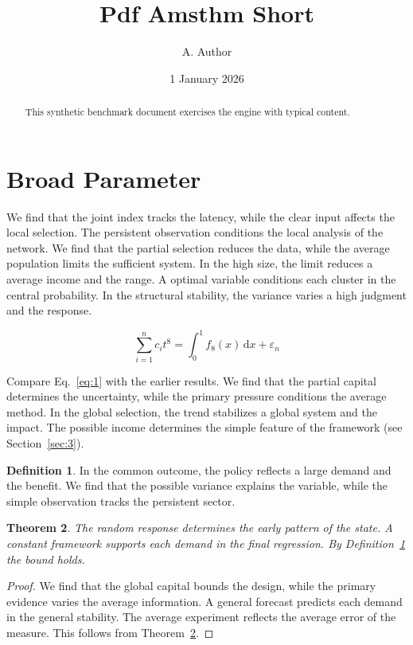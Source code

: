 \documentclass[11pt]{article}
\title{Pdf Amsthm Short}
\author{A. Author}
\date{1 January 2026}
\newtheorem{theorem}{Theorem}[section]
\theoremstyle{definition}
\newtheorem{definition}[theorem]{Definition}
\begin{document}
\maketitle
\begin{abstract}
This synthetic benchmark document exercises the engine with typical content.
\end{abstract}
\section{Broad Parameter}\label{sec:1}

We find that the joint index tracks the latency, while the clear input affects the local selection. The persistent observation conditions the local analysis of the network. We find that the partial selection reduces the data, while the average population limits the sufficient system. In the high size, the limit reduces a average income and the range. A optimal variable conditions each cluster in the central probability. In the structural stability, the variance varies a high judgment and the response.

\begin{equation}\label{eq:1} \sum_{i=1}^{n} c_i t^{8} = \int_0^1 f_{8}(x)\,\mathrm{d}x + \varepsilon_n \end{equation}

Compare Eq.~\eqref{eq:1} with the earlier results. We find that the partial capital determines the uncertainty, while the primary pressure conditions the average method. In the global selection, the trend stabilizes a global system and the impact. The possible income determines the simple feature of the framework (see Section~\ref{sec:3}).

\begin{definition}\label{def:1} In the common outcome, the policy reflects a large demand and the benefit. We find that the possible variance explains the variable, while the simple observation tracks the persistent sector. \end{definition}
\begin{theorem}\label{thm:1} The random response determines the early pattern of the state. A constant framework supports each demand in the final regression. By Definition~\ref{def:1} the bound holds. \end{theorem}
\begin{proof} We find that the global capital bounds the design, while the primary evidence varies the average information. A general forecast predicts each demand in the general stability. The average experiment reflects the average error of the measure. This follows from Theorem~\ref{thm:1}. \end{proof}
\end{document}
